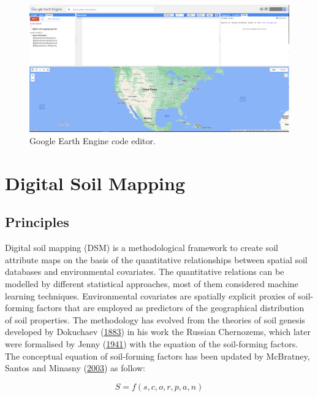 \documentclass[
  10pt,
  b5paper,
  oneside]{book}
\begin{document}
\begin{figure}
\includegraphics[width=26.69in]{images/2.1_GEE_codeeditor} \caption{Google Earth Engine code editor.}\label{fig:GEE2}
\end{figure}

\hypertarget{digital-soil-mapping}{%
\chapter{Digital Soil Mapping}\label{digital-soil-mapping}}

\hypertarget{principles}{%
\section{Principles}\label{principles}}

Digital soil mapping (DSM) is a methodological framework to create soil attribute maps on the basis of the quantitative relationships between spatial soil databases and environmental covariates. The quantitative relations can be modelled by different statistical approaches, most of them considered machine learning techniques. Environmental covariates are spatially explicit proxies of soil-forming factors that are employed as predictors of the geographical distribution of soil properties. The methodology has evolved from the theories of soil genesis developed by Dokuchaev (\protect\hyperlink{ref-Dokuchaev1883}{1883}) in his work the Russian Chernozems, which later were formalised by Jenny (\protect\hyperlink{ref-Jenny1941}{1941}) with the equation of the soil-forming factors. The conceptual equation of soil-forming factors has been updated by McBratney, Santos and Minasny (\protect\hyperlink{ref-McBratney2003}{2003}) as follow:

\begin{equation} 
  S = f\left(s,c,o,r,p,a,n\right)
  \label{eq:scorpan}
\end{equation}
\end{document}
